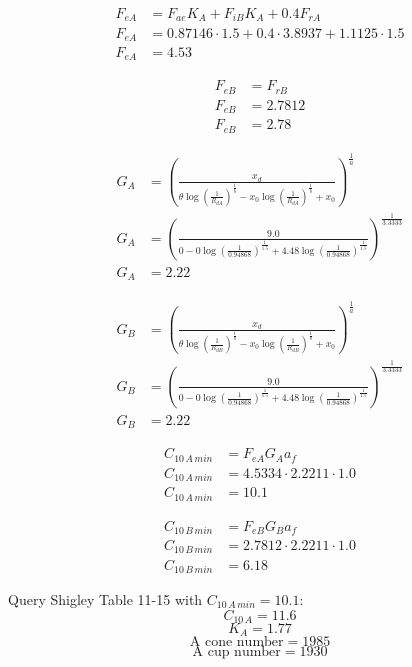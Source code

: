 \begin{align*}
    F_{eA} &= F_{ae} K_{A} + F_{iB} K_{A} + 0.4 F_{rA}\\
    F_{eA} &= 0.87146 \cdot 1.5 + 0.4 \cdot 3.8937 + 1.1125 \cdot 1.5\\
    F_{eA} &= 4.53
\end{align*}

\begin{align*}
    F_{eB} &= F_{rB}\\
    F_{eB} &= 2.7812\\
    F_{eB} &= 2.78
\end{align*}

\begin{align*}
    G_{A} &= \left(\frac{x_{d}}{\theta \log{\left(\frac{1}{R_{dA}} \right)}^{\frac{1}{b}} - x_{0} \log{\left(\frac{1}{R_{dA}} \right)}^{\frac{1}{b}} + x_{0}}\right)^{\frac{1}{a}}\\
    G_{A} &= \left(\frac{9.0}{0 - 0 \log{\left(\frac{1}{0.94868} \right)}^{\frac{1}{1.5}} + 4.48 \log{\left(\frac{1}{0.94868} \right)}^{\frac{1}{1.5}}}\right)^{\frac{1}{3.3333}}\\
    G_{A} &= 2.22
\end{align*}

\begin{align*}
    G_{B} &= \left(\frac{x_{d}}{\theta \log{\left(\frac{1}{R_{dB}} \right)}^{\frac{1}{b}} - x_{0} \log{\left(\frac{1}{R_{dB}} \right)}^{\frac{1}{b}} + x_{0}}\right)^{\frac{1}{a}}\\
    G_{B} &= \left(\frac{9.0}{0 - 0 \log{\left(\frac{1}{0.94868} \right)}^{\frac{1}{1.5}} + 4.48 \log{\left(\frac{1}{0.94868} \right)}^{\frac{1}{1.5}}}\right)^{\frac{1}{3.3333}}\\
    G_{B} &= 2.22
\end{align*}

\begin{align*}
    C_{10\,A\,min} &= F_{eA} G_{A} a_{f}\\
    C_{10\,A\,min} &= 4.5334 \cdot 2.2211 \cdot 1.0\\
    C_{10\,A\,min} &= 10.1
\end{align*}

\begin{align*}
    C_{10\,B\,min} &= F_{eB} G_{B} a_{f}\\
    C_{10\,B\,min} &= 2.7812 \cdot 2.2211 \cdot 1.0\\
    C_{10\,B\,min} &= 6.18
\end{align*}

Query Shigley Table 11-15 with $C_{10\,A\,min} = 10.1 $: 
$$C_{10\,A} = 11.6 $$
$$K_{A} = 1.77 $$
$$\text{A cone number} = 1985 $$
$$\text{A cup number} = 1930 $$

